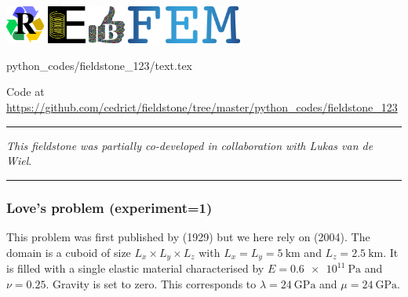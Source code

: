 \includegraphics[height=1.25cm]{images/pictograms/replication}
\includegraphics[height=1.25cm]{images/pictograms/elasticity}
\includegraphics[height=1.25cm]{images/pictograms/benchmark}
\includegraphics[height=1.25cm]{images/pictograms/FEM}

\begin{flushright} {\tiny {\color{gray} python\_codes/fieldstone\_123/text.tex}} \end{flushright}



\begin{center}

Code at \url{https://github.com/cedrict/fieldstone/tree/master/python_codes/fieldstone_123}
\end{center}

\par\noindent\rule{\textwidth}{0.4pt}

{\sl This fieldstone was partially co-developed in collaboration with Lukas van de Wiel}. 

\par\noindent\rule{\textwidth}{0.4pt}

\subsubsection*{Love's problem (experiment=1)}

This problem was first published by \textcite{love29} (1929)
but we here rely on \textcite{bebe04} (2004).
The domain is a cuboid of size $L_x\times L_y \times L_z$ with $L_x=L_y=\SI{5}{\km}$
and $L_z=\SI{2.5}{\km}$. It is filled with a single elastic material characterised 
by $E=\SI{0.6e11}{\pascal}$ and $\nu=0.25$. Gravity is set to zero.
This corresponds to $\lambda= \SI{24}{\giga\pascal}$ and $\mu=\SI{24}{\giga\pascal}$.

